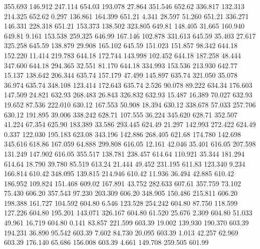  355.693  146.912  247.114       654.03
 193.078   27.864  351.546       652.62
 336.817  132.313  214.325       652.62
   0.297  136.861  164.399       651.21
   4.341   28.597   51.260       651.21
 336.271  146.331  228.318       651.21
 153.373  138.502  323.805       649.81
 148.405   31.665  160.940       649.81
   9.161  153.538  259.325       646.99
 167.146  102.878  331.613       645.59
  35.403   27.617  325.258       645.59
 138.879   29.908  165.102       645.59
 151.023  151.857   98.342       644.18
 152.220   11.414  219.783       644.18
 172.744  143.998  102.452       644.18
 187.258   48.444  347.600       644.18
 294.365   32.551   81.170       644.18
 334.993  153.536  213.930       642.77
  15.137  138.642  206.344       635.74
 157.179   47.499  145.897       635.74
 321.050   35.078   36.974       635.74
 348.108  123.414  172.643       635.74
   2.526   90.078   89.222       634.34
 176.603  147.509   24.821       632.93
 268.483   26.843  326.832       632.93
  15.487   16.389   70.027       632.93
  19.652   87.536  222.010       630.12
 167.553   50.908   18.394       630.12
 338.678   57.033  257.706       630.12
 191.895   39.006  338.242       628.71
 107.555   36.224  345.620       628.71
 352.507   41.224   67.354       625.90
 183.389   33.586  293.445       624.49
  21.297  142.993  272.422       624.49
   0.337  122.030  195.183       623.08
 343.196  142.886  268.405       621.68
 174.780  142.698  345.616       618.86
 167.059   64.888  299.808       616.05
  12.161   42.046   35.401       616.05
 207.598  131.249  147.902       616.05
 355.517  138.781  238.457       614.64
 110.921   35.344  181.294       614.64
  18.790   39.780   85.519       613.24
  21.444   49.452  231.195       611.83
 123.340    9.234  166.814       610.42
 348.095  139.815  214.946       610.42
  11.936   36.494   42.885       610.42
 186.952  109.824  151.468       609.02
 167.891   43.752  282.633       607.61
 357.759   73.102   75.430       606.20
 357.543   97.230  203.309       606.20
 348.905  150.486  215.811       606.20
 198.388  161.727  104.592       604.80
   6.546  123.528  254.242       604.80
  87.750  118.599  127.226       604.80
 195.201  143.071  326.167       604.80
  61.520   25.676    2.309       604.80
  51.033   49.961   16.719       604.80
   0.141   83.857  221.599       603.39
  19.002  139.930  190.370       603.39
 194.231   36.890   95.542       603.39
   7.602   84.730   20.095       603.39
   1.013   42.257   62.969       603.39
 176.140   65.686  156.008       603.39
   4.661  149.708  259.505       601.99
